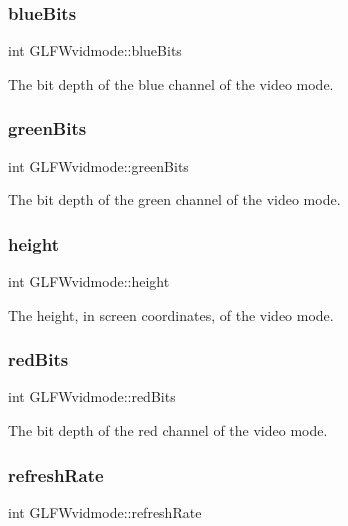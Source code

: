 \subsubsection{\texorpdfstring{blue\+Bits}{blueBits}}
{\footnotesize\ttfamily int G\+L\+F\+Wvidmode\+::blue\+Bits}

The bit depth of the blue channel of the video mode. \mbox{\label{structGLFWvidmode_a292fdd281f3485fb3ff102a5bda43faa}} 
\subsubsection{\texorpdfstring{green\+Bits}{greenBits}}
{\footnotesize\ttfamily int G\+L\+F\+Wvidmode\+::green\+Bits}

The bit depth of the green channel of the video mode. \mbox{\label{structGLFWvidmode_ac65942a5f6981695517437a9d571d03c}} 
\subsubsection{\texorpdfstring{height}{height}}
{\footnotesize\ttfamily int G\+L\+F\+Wvidmode\+::height}

The height, in screen coordinates, of the video mode. \mbox{\label{structGLFWvidmode_a6066c4ecd251098700062d3b735dba1b}} 
\subsubsection{\texorpdfstring{red\+Bits}{redBits}}
{\footnotesize\ttfamily int G\+L\+F\+Wvidmode\+::red\+Bits}

The bit depth of the red channel of the video mode. \mbox{\label{structGLFWvidmode_a791bdd6c7697b09f7e9c97054bf05649}} 
\subsubsection{\texorpdfstring{refresh\+Rate}{refreshRate}}
{\footnotesize\ttfamily int G\+L\+F\+Wvidmode\+::refresh\+Rate}

